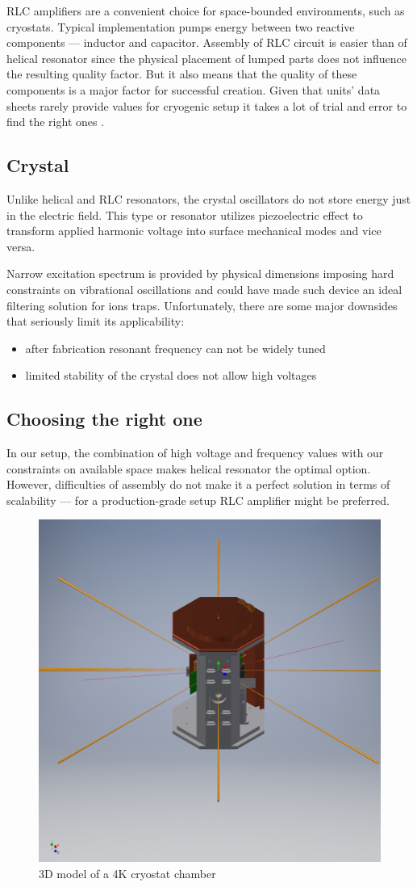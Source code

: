 RLC amplifiers are a convenient choice for space-bounded environments, such as cryostats. Typical implementation pumps energy between two reactive components --- inductor and capacitor. Assembly of RLC circuit is easier than of helical resonator since the physical placement of lumped parts does not influence the resulting quality factor. But it also means that the quality of these components is a major factor for successful creation. Given that units' data sheets rarely provide values for cryogenic setup it takes a lot of trial and error to find the right ones \cite{Gandolfi2010}.
\subsection{Crystal}
Unlike helical and RLC resonators, the crystal oscillators do not store energy just in the electric field. This type or resonator utilizes piezoelectric effect to transform applied harmonic voltage into surface mechanical modes and vice versa.

Narrow excitation spectrum is provided by physical dimensions imposing hard constraints on vibrational oscillations and could have made such device an ideal filtering solution for ions traps. Unfortunately, there are some major downsides that seriously limit its applicability:
\begin{itemize}
	\item after fabrication resonant frequency can not be widely tuned
	\item limited stability of the crystal does not allow high voltages
\end{itemize}
\subsection{Choosing the right one}
In our setup, the combination of high voltage and frequency values with our constraints on available space makes helical resonator the optimal option. However, difficulties of assembly do not make it a perfect solution in terms of scalability --- for a production-grade setup RLC amplifier might be preferred.

\begin{figure}[h]
	\includegraphics[width=\textwidth]{images/4K_chamber}
	\caption{3D model of a 4K cryostat chamber}
\end{figure}